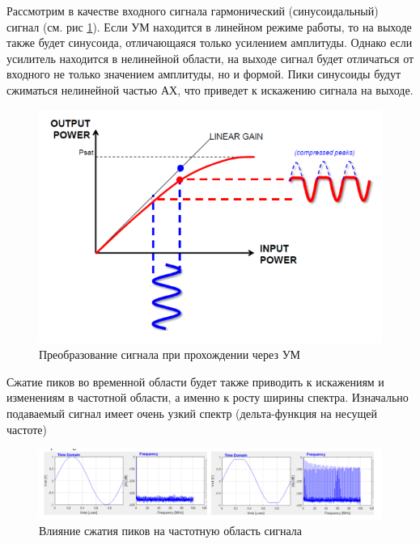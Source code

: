 Рассмотрим в качестве входного сигнала гармонический (синусоидальный)
сигнал (см. рис \ref{fig:pa_distortion_sin}). Если УМ находится в линейном
режиме работы, то на выходе также будет синусоида, отличающаяся только
усилением амплитуды. Однако если усилитель находится в нелинейной области,
на выходе сигнал будет отличаться от входного не только значением
амплитуды, но и формой. Пики синусоиды будут сжиматься нелинейной частью
АХ, что приведет к искажению сигнала на выходе.

\begin{figure}[h!]
    \centering
    \includegraphics[width=0.7\linewidth]{figs/example_pa_signal.png}
    \caption{Преобразование сигнала при прохождении через УМ}
    \label{fig:pa_distortion_sin}
\end{figure}

Сжатие пиков во временной области будет также приводить к искажениям и 
изменениям в частотной
области, а именно к росту ширины спектра. Изначально подаваемый сигнал
имеет очень узкий спектр (дельта-функция на несущей частоте) 

\begin{figure}[h!]
    \centering
    \includegraphics[width=0.9\linewidth]{figs/pa_spectral_growth.png}
    \caption{Влияние сжатия пиков на частотную область сигнала}
    \label{fig:pa_distortion_freq}
\end{figure}







